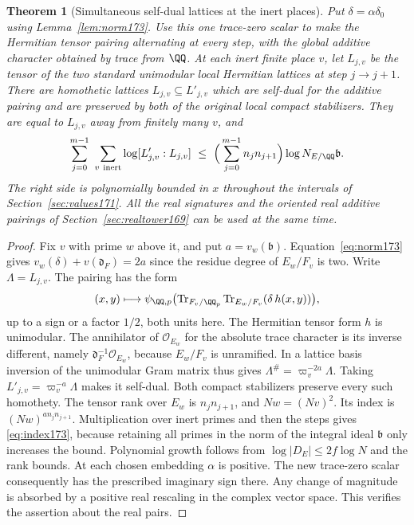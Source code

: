 \documentclass[a4paper,11pt]{article}
\newtheorem{theorem}[proposition]{Theorem}
\theoremstyle{definition}
\theoremstyle{remark}
\numberwithin{equation}{section}
\newcommand{\OO}{\mathcal O}
\begin{document}
\begin{theorem}[Simultaneous self-dual lattices at the inert places]
\label{thm:lattices173}
Put \(\delta=\alpha\delta_0\) using Lemma~\ref{lem:norm173}.
Use this one trace-zero scalar to make the Hermitian tensor
pairing alternating at every step, with the global additive
character obtained by trace from \(\QQ\). At each inert finite
place \(v\), let \(L_{j,v}\) be the tensor of the two standard
unimodular local Hermitian lattices at step \(j\to j+1\).
There are homothetic lattices \(L_{j,v}\subseteq L'_{j,v}\)
which are self-dual for the additive pairing and are preserved
by both of the original local compact stabilizers. They are
equal to \(L_{j,v}\) away from finitely many \(v\), and
\begin{equation}
 \sum_{j=0}^{m-1}\ \sum_{v\ {\rm inert}}
        \log[L'_{j,v}:L_{j,v}]
   \ \le\ \Big(\sum_{j=0}^{m-1} n_jn_{j+1}\Big)
                     \log N_{E/\QQ}\mathfrak b.              \label{eq:index173}
\end{equation}
The right side is polynomially bounded in \(x\) throughout
the intervals of Section~\ref{sec:values171}. All the real
signatures and the oriented real additive pairings of
Section~\ref{sec:realtower169} can be used at the same time.
\end{theorem}
\begin{proof}
Fix \(v\) with prime \(w\) above it, and put \(a=v_w(\mathfrak b)\).
Equation~\eqref{eq:norm173} gives
\(v_w(\delta)+v(\mathfrak d_F)=2a\) since the residue degree
of \(E_w/F_v\) is two. Write \(\Lambda=L_{j,v}\).
The pairing has the form
\[
 (x,y)\longmapsto
 \psi_{\QQ,p}\bigl(\operatorname{Tr}_{F_v/\QQ_p}
      \operatorname{Tr}_{E_w/F_v}(\delta\,h(x,y))\bigr),
\]
up to a sign or a factor \(1/2\), both units here. The
Hermitian tensor form \(h\) is unimodular. The annihilator
of \(\OO_{E_w}\) for the absolute trace character is its
inverse different, namely
\(\mathfrak d_F^{-1}\OO_{E_w}\), because \(E_w/F_v\)
is unramified. In a lattice basis inversion of the
unimodular Gram matrix thus gives
\(\Lambda^\#=\varpi_v^{-2a}\Lambda\). Taking
\(L'_{j,v}=\varpi_v^{-a}\Lambda\) makes it self-dual.
Both compact stabilizers preserve every such homothety.
The tensor rank over \(E_w\) is \(n_jn_{j+1}\), and
\(Nw=(Nv)^2\). Its index is \((Nw)^{a n_jn_{j+1}}\).
Multiplication over inert primes and then the steps gives
\eqref{eq:index173}, because retaining all primes in the
norm of the integral ideal \(\mathfrak b\) only increases
the bound. Polynomial growth follows from
\(\log|D_E|\le2f\log N\) and the rank bounds.
At each chosen embedding \(\alpha\) is positive. The new
trace-zero scalar consequently has the prescribed imaginary
sign there. Any change of magnitude is absorbed by a positive
real rescaling in the complex vector space. This verifies
the assertion about the real pairs.
\end{proof}
\end{document}
